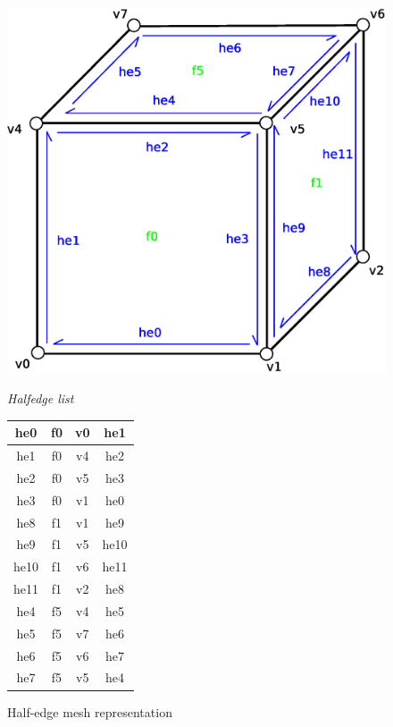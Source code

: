 \begin{figure}[h]

\begin{minipage}[hb]{0.65\linewidth}
\centering
\includegraphics[width=0.6\linewidth]{../img/he_rep_mesh.eps}
\label{fig:figure1}
\end{minipage}
\hspace{0.5cm}
\begin{minipage}[hb]{0.25\linewidth}
\centering
\emph{Halfedge list}
\vspace{1mm}

\begin{tabular}{|c|c|c|c|}
\hline
\textsf{he0} & \textsf{f0} & \textsf{v0} & \textsf{he1}\\
\hline
\textsf{he1} & \textsf{f0} & \textsf{v4} & \textsf{he2}\\
\hline
\textsf{he2} & \textsf{f0} & \textsf{v5} & \textsf{he3}\\
\hline
\textsf{he3} & \textsf{f0} & \textsf{v1} & \textsf{he0}\\
\hline

\hline
\textsf{he8} & \textsf{f1} & \textsf{v1} & \textsf{he9}\\
\hline
\textsf{he9} & \textsf{f1} & \textsf{v5} & \textsf{he10}\\
\hline
\textsf{he10} & \textsf{f1} & \textsf{v6} & \textsf{he11}\\
\hline
\textsf{he11} & \textsf{f1} & \textsf{v2} & \textsf{he8}\\
\hline

\hline
\textsf{he4} & \textsf{f5} & \textsf{v4} & \textsf{he5}\\
\hline
\textsf{he5} & \textsf{f5} & \textsf{v7} & \textsf{he6}\\
\hline
\textsf{he6} & \textsf{f5} & \textsf{v6} & \textsf{he7}\\
\hline
\textsf{he7} & \textsf{f5} & \textsf{v5} & \textsf{he4}\\
\hline
\end{tabular}
\label{fig:he_mesh}
\end{minipage}

\caption{Half-edge mesh representation}

\end{figure}
